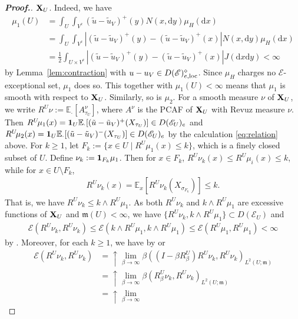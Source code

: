 \documentclass[12pt,a4paper]{article}
\renewcommand{\d}{\mathrm{d}}
\newcommand{\m}{\mathfrak{m} }
\newcommand{\loc}{{\rm loc}}
\newcommand{\1}{{\bf 1}}
\begin{document}
\begin{proof}[{\bf Proof.}]
${\bf X}_U$. Indeed, we have 
\begin{align*}
\mu_1(U)&=\int_U\int_{V^c}(\tilde{u}-\tilde{u}_V)^+(y)N(x,{\d} y)\mu_H({\d} x)\\
&=\int_U\int_{V^c}|(\tilde{u}-\tilde{u}_V)^+(y)-(\tilde{u}-\tilde{u}_V)^+(x)|N(x,{\d} y)\mu_H({\d} x)\\
&=\frac12\int_{U\times V^c}|(\tilde{u}-\tilde{u}_V)^+(y)-(\tilde{u}-\tilde{u}_V)^+(x)|J({\d} x{\d} y)
<\infty
\end{align*}
by Lemma~\ref{lem:contraction} with $u-u_V\in D(\mathscr{E})^{\diamond}_{e,\loc}$. Since $\mu_H$ charges no $\mathscr{E}$-exceptional set, 
$\mu_1$ does so. 
This together with $\mu_1(U)<\infty$ means that $\mu_1$ is smooth with respect to 
${\bf X}_U$. Similarly, so is $\mu_2$. 
For a smooth measure $\nu$ of ${\bf X}_U$, we write  
$R^U\!\nu:=\mathbb{E}_{\cdot}[A_{\tau_U}^{\nu}]$, where $A^{\nu}$ is the PCAF of ${\bf X}_U$ with Revuz measure $\nu$.
Then $R^U\!\mu_1(x)=\1_U\mathbb{E}_{\cdot}[(\tilde{u}-\tilde{u}_V)^+(X_{\tau_U})]\in D(\mathscr{E}_U)_e$ and $R^U\!\mu_2(x)=\1_U\mathbb{E}_{\cdot}[(\tilde{u}-\tilde{u}_V)^-(X_{\tau_U})]\in D(\mathscr{E}_U)_e$
by the calculation \eqref{eq:relation} above.  
For $k\geq1$, let $F_k:=\{x\in U\mid R^U\!\mu_1(x)\leq k\}$, which is a finely closed subset of $U$. Define $\nu_k:=\1_{F_k}\mu_1$. 
Then for $x\in F_k$, $R^U\!\nu_k(x)\leq R^U\!\mu_i(x)\leq k$, while for $x\in U\setminus F_k$, 
\begin{align*}
R^U\!\nu_k(x)=\mathbb{E}_x[R^U\!\nu_k(X_{\sigma_{F_k}})]\leq k.
\end{align*}
That is, we have $R^U\!\nu_k\leq k\land R^U\!\mu_1$. As both
 $R^U\!\nu_k$ and $k\land R^U\!\mu_1$ are excessive functions of ${\bf X}_U$ and $\m(U)<\infty$, we have $\{R^U\!\nu_k,k\land R^U\!\mu_1\}\subset D(\mathscr{E}_U)$ and 
 \begin{align*}
 \mathscr{E}(R^U\!\nu_k,R^U\!\nu_k)\leq\mathscr{E}(k\land R^U\!\mu_1,k\land R^U\!\mu_1)\leq \mathscr{E}(R^U\!\mu_1,R^U\!\mu_1)<\infty
 \end{align*}
by \cite[Theorem~1.1.5 and Lemma~1.2.3]{CFbook}. Moreover, for each $k\geq1$, we have by \cite[Theorem~4.1.1]{CFbook} or \cite[Theorem~5.1.3]{FOT}
\begin{align*}
\mathscr{E}(R^U\!\nu_k,R^U\!\nu_k)&=\uparrow\lim_{\beta\to\infty}\beta((I-\beta R^U_{\beta})R^U\!\nu_k,R^U\!\nu_k)_{L^2(U;{\m})}\\
&=\uparrow\lim_{\beta\to\infty}
\beta (R^U_{\beta}\nu_k,R^U\!\nu_k)_{L^2(U;{\m})}\\
&=\uparrow\lim_{\beta\to\infty}

\end{align*}
\end{proof}
\end{document}
